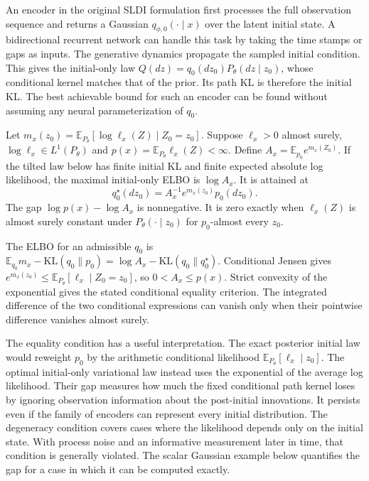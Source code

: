 \documentclass[12pt]{article}
\newcommand{\E}{\mathbb{E}}
\newcommand{\KL}{\mathrm{KL}}
\begin{document}
An encoder in the original SLDI formulation first processes the full observation sequence and returns a Gaussian \(q_{\phi,0}(\cdot\mid x)\) over the latent initial state. A bidirectional recurrent network can handle this task by taking the time stamps or gaps as inputs. The generative dynamics propagate the sampled initial condition. This gives the initial-only law \(Q(dz)=q_0(dz_0)P_\theta(dz\mid z_0)\), whose conditional kernel matches that of the prior. Its path KL is therefore the initial KL. The best achievable bound for such an encoder can be found without assuming any neural parameterization of \(q_0\).

Let \(m_x(z_0)=\E_{P_\theta}[\log \ell_x(Z)\mid Z_0=z_0]\). Suppose \(\ell_x>0\) almost surely, \(\log\ell_x\in L^1(P_\theta)\) and \(p(x)=\E_{P_\theta}\ell_x(Z)<\infty\). Define \(A_x=\E_{p_0}e^{m_x(Z_0)}\). If the tilted law below has finite initial KL and finite expected absolute log likelihood, the maximal initial-only ELBO is \(\log A_x\). It is attained at
\[
 q_0^\star(dz_0)=A_x^{-1}e^{m_x(z_0)}p_0(dz_0).
\]
The gap \(\log p(x)-\log A_x\) is nonnegative. It is zero exactly when \(\ell_x(Z)\) is almost surely constant under \(P_\theta(\cdot\mid z_0)\) for \(p_0\)-almost every \(z_0\).

The ELBO for an admissible \(q_0\) is \(\E_{q_0}m_x-\KL(q_0\|p_0)=\log A_x-\KL(q_0\|q_0^\star)\). Conditional Jensen gives \(e^{m_x(z_0)}\le \E_{P_\theta}[\ell_x\mid Z_0=z_0]\), so \(0<A_x\le p(x)\). Strict convexity of the exponential gives the stated conditional equality criterion. The integrated difference of the two conditional expressions can vanish only when their pointwise difference vanishes almost surely.

The equality condition has a useful interpretation. The exact posterior initial law would reweight \(p_0\) by the arithmetic conditional likelihood \(\E_{P_\theta}[\ell_x\mid z_0]\). The optimal initial-only variational law instead uses the exponential of the average log likelihood. Their gap measures how much the fixed conditional path kernel loses by ignoring observation information about the post-initial innovations. It persists even if the family of encoders can represent every initial distribution. The degeneracy condition covers cases where the likelihood depends only on the initial state. With process noise and an informative measurement later in time, that condition is generally violated. The scalar Gaussian example below quantifies the gap for a case in which it can be computed exactly.
\end{document}
